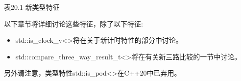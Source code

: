 \begin{center}
表20.1 新类型特征
\end{center}

以下章节将详细讨论这些特征，除了以下特征:

\begin{itemize}
\item
std::is\_clock\_v<>将在关于新计时特性的部分中讨论。

\item
std::compare\_three\_way\_result\_t<>将在有关新三路比较的一节中讨论。
\end{itemize}

另外请注意，类型特性std::is\_pod<>在C++20中已弃用。












